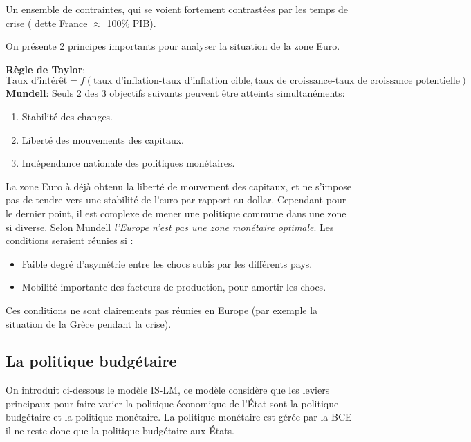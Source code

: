 Un ensemble de contraintes, qui se voient fortement contrastées par les temps de crise ( dette France $\approx$ 100$\%$ PIB).

On présente 2 principes importants pour analyser la situation de la zone Euro. 
\newline

\textbf{Règle de Taylor}: 	
\[
	\text{Taux d'intérêt}= f(\text{taux d'inflation-taux d'inflation cible},\text{taux de croissance-taux de croissance potentielle})
\]
\textbf{Mundell}: Seuls 2 des 3 objectifs suivants peuvent être atteints simultanéments: 
\begin{enumerate}
	\item Stabilité des changes.
	\item Liberté des mouvements des capitaux.
	\item Indépendance nationale des politiques monétaires. 
\end{enumerate}

La zone Euro à déjà obtenu la liberté de mouvement des capitaux, et ne s'impose pas de tendre vers une stabilité de l'euro par rapport au dollar. Cependant pour le
dernier point, il est complexe de mener une politique commune dans une zone si diverse. Selon Mundell \emph{l'Europe n'est pas une zone monétaire optimale}.
Les conditions seraient réunies si : 
\begin{itemize}
	\item Faible degré d'asymétrie entre les chocs subis par les différents pays.
	\item Mobilité importante des facteurs de production, pour amortir les chocs. 
\end{itemize}
Ces conditions ne sont clairements pas réunies en Europe (par exemple la situation de la Grèce pendant la crise).
\subsection{La politique budgétaire} %
\label{sub:la_politique_budgetaire}
On introduit ci-dessous le modèle IS-LM, ce modèle considère que les leviers principaux pour faire varier la politique économique de l'État sont la politique 
budgétaire et la politique monétaire. La politique monétaire est gérée par la BCE il ne reste donc que la politique budgétaire aux États.

